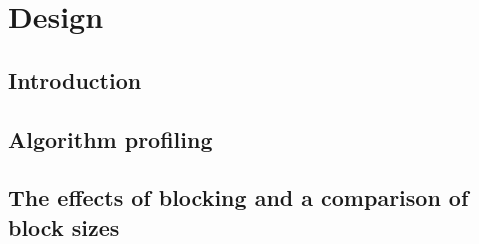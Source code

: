 \chapter{Design}
\label{design}

\section{Introduction}
\label{design:Introduction}


\section{Algorithm profiling}
\label{design:algorithmProfiling}


\section{The effects of blocking and a comparison of block sizes}
\label{design:blockSize}

